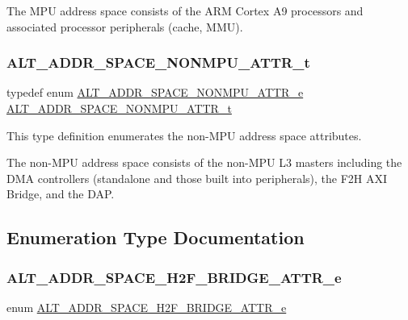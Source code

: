 The M\+PU address space consists of the A\+RM Cortex A9 processors and associated processor peripherals (cache, M\+MU). \mbox{\label{group__ADDR__SPACE__MGR__REMAP_ga380facdcf5796d231a7bfaed1f444178}} 
\subsubsection{\texorpdfstring{ALT\_ADDR\_SPACE\_NONMPU\_ATTR\_t}{ALT\_ADDR\_SPACE\_NONMPU\_ATTR\_t}}
{\footnotesize\ttfamily typedef enum \mbox{\hyperlink{group__ADDR__SPACE__MGR__REMAP_gae7413407ef45e9954d426e6e73a75463}{A\+L\+T\+\_\+\+A\+D\+D\+R\+\_\+\+S\+P\+A\+C\+E\+\_\+\+N\+O\+N\+M\+P\+U\+\_\+\+A\+T\+T\+R\+\_\+e}}  \mbox{\hyperlink{group__ADDR__SPACE__MGR__REMAP_ga380facdcf5796d231a7bfaed1f444178}{A\+L\+T\+\_\+\+A\+D\+D\+R\+\_\+\+S\+P\+A\+C\+E\+\_\+\+N\+O\+N\+M\+P\+U\+\_\+\+A\+T\+T\+R\+\_\+t}}}

This type definition enumerates the non-\/\+M\+PU address space attributes.

The non-\/\+M\+PU address space consists of the non-\/\+M\+PU L3 masters including the D\+MA controllers (standalone and those built into peripherals), the F2H A\+XI Bridge, and the D\+AP. 

\subsection{Enumeration Type Documentation}
\mbox{\label{group__ADDR__SPACE__MGR__REMAP_ga590307e85b3ad755df3f95dbb63f5f34}} 
\subsubsection{\texorpdfstring{ALT\_ADDR\_SPACE\_H2F\_BRIDGE\_ATTR\_e}{ALT\_ADDR\_SPACE\_H2F\_BRIDGE\_ATTR\_e}}
{\footnotesize\ttfamily enum \mbox{\hyperlink{group__ADDR__SPACE__MGR__REMAP_ga590307e85b3ad755df3f95dbb63f5f34}{A\+L\+T\+\_\+\+A\+D\+D\+R\+\_\+\+S\+P\+A\+C\+E\+\_\+\+H2\+F\+\_\+\+B\+R\+I\+D\+G\+E\+\_\+\+A\+T\+T\+R\+\_\+e}}}

